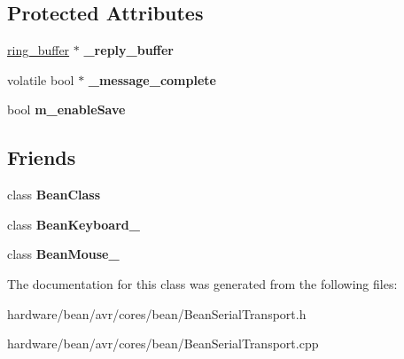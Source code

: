 \subsection*{Protected Attributes}
\begin{DoxyCompactItemize}
\item 
\hypertarget{class_bean_serial_transport_ada9a8d925cc6d7c0202af809dbab27b1}{}\hyperlink{structring__buffer}{ring\+\_\+buffer} $\ast$ {\bfseries \+\_\+reply\+\_\+buffer}\label{class_bean_serial_transport_ada9a8d925cc6d7c0202af809dbab27b1}

\item 
\hypertarget{class_bean_serial_transport_ab742d845d056f3f503847595696528ac}{}volatile bool $\ast$ {\bfseries \+\_\+message\+\_\+complete}\label{class_bean_serial_transport_ab742d845d056f3f503847595696528ac}

\item 
\hypertarget{class_bean_serial_transport_acdf7979ded6dcd3ad69261854689e73f}{}bool {\bfseries m\+\_\+enable\+Save}\label{class_bean_serial_transport_acdf7979ded6dcd3ad69261854689e73f}

\end{DoxyCompactItemize}
\subsection*{Friends}
\begin{DoxyCompactItemize}
\item 
\hypertarget{class_bean_serial_transport_a2cf0a51d7d77d65a4cdeb298023c8a78}{}class {\bfseries Bean\+Class}\label{class_bean_serial_transport_a2cf0a51d7d77d65a4cdeb298023c8a78}

\item 
\hypertarget{class_bean_serial_transport_aca3a717d58bd1a4561e0a043fda0410b}{}class {\bfseries Bean\+Keyboard\+\_\+}\label{class_bean_serial_transport_aca3a717d58bd1a4561e0a043fda0410b}

\item 
\hypertarget{class_bean_serial_transport_ac27647c19d49006fb74d95fa5a27e570}{}class {\bfseries Bean\+Mouse\+\_\+}\label{class_bean_serial_transport_ac27647c19d49006fb74d95fa5a27e570}

\end{DoxyCompactItemize}


The documentation for this class was generated from the following files\+:\begin{DoxyCompactItemize}
\item 
hardware/bean/avr/cores/bean/Bean\+Serial\+Transport.\+h\item 
hardware/bean/avr/cores/bean/Bean\+Serial\+Transport.\+cpp\end{DoxyCompactItemize}
